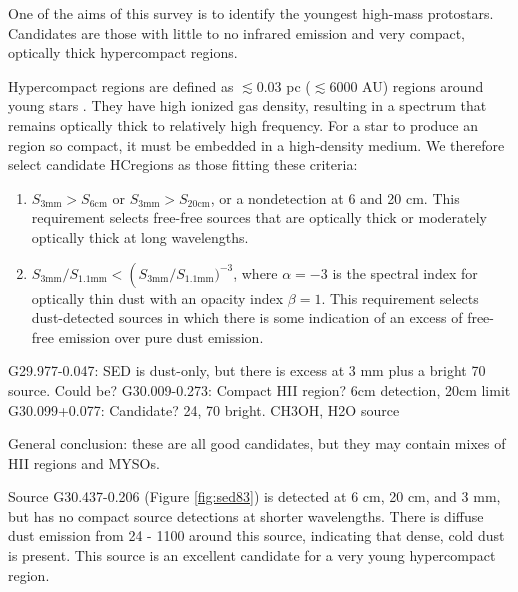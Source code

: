 \documentclass[twocolumn]{aastex62}
\begin{document}
One of the aims of this survey is to identify the youngest high-mass
protostars.  Candidates are those with little to no infrared emission and very
compact, optically thick hypercompact \hii regions.

Hypercompact \hii regions are defined as $\lesssim0.03$ pc ($\lesssim6000$ AU)
\hii regions around young stars \citep{Kurtz2005b}.  They have high ionized
gas density, resulting in a spectrum that remains optically thick to relatively
high frequency.  For a star to produce an \hii region so compact, it must be
embedded in a high-density medium.  We therefore select candidate HC\hii regions
as those fitting these criteria:
\begin{enumerate}
    \item $S_{3 \mathrm{mm}} > S_{6 \mathrm{cm}}$ or $S_{3 \mathrm{mm}} > S_{20 \mathrm{cm}}$,
        or a nondetection at 6 and 20 cm.  This requirement selects free-free sources that are optically
        thick or moderately optically thick at long wavelengths.
    \item $S_{3 \mathrm{mm}} / S_{1.1 \mathrm{mm}} < \left(S_{3
        \mathrm{mm}} / S_{1.1 \mathrm{mm}})^{-3}$,  where $\alpha=-3$ is the
        spectral index for optically thin dust with an opacity index $\beta=1$.
        This requirement selects dust-detected sources in which there is some
        indication of an excess of free-free emission over pure dust emission.
\end{enumerate}

G29.977-0.047: SED is dust-only, but there is excess at 3 mm plus a bright 70 \um source.  Could be?
G30.009-0.273: Compact HII region?  6cm detection, 20cm limit
G30.099+0.077: Candidate?  24, 70 \um bright.  CH3OH, H2O source

General conclusion: these are all good candidates, but they may contain mixes of HII regions and MYSOs.


Source G30.437-0.206 (Figure \ref{fig:sed83}) is detected at 6 cm, 20 cm, and 3
mm, but has no compact source detections at shorter wavelengths.  There is
diffuse dust emission from 24 - 1100 \um around this source, indicating that
dense, cold dust is present.  This source is an excellent candidate for a very
young hypercompact \hii region.
\end{document}

